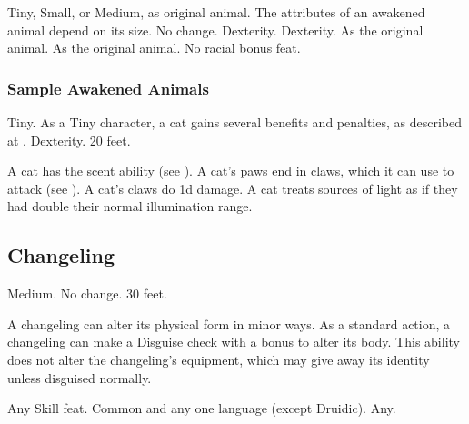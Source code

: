          Tiny, Small, or Medium, as original animal.
         The attributes of an awakened animal depend on its size.
         No change.
          Dexterity.
          Dexterity.
         As the original animal.
         As the original animal.
         No racial bonus feat.

        \subsubsection{Sample Awakened Animals}


             Tiny. As a Tiny character, a cat gains several benefits and penalties, as described at .
              Dexterity.
             20 feet.
            \begin{itemize}
                 A cat has the scent ability (see ).
                 A cat's paws end in claws, which it can use to attack (see ). A cat's claws do \minus1d damage.
                 A cat treats sources of light as if they had double their normal illumination range.
            \end{itemize}

        \subsection{Changeling}

             Medium.
             No change.
             30 feet.
            \begin{itemize}
                 A changeling can alter its physical form in minor ways. As a standard action, a changeling can make a Disguise check with a  bonus to alter its body. This ability does not alter the changeling's equipment, which may give away its identity unless disguised normally.
            \end{itemize}
             Any Skill feat.
             Common and any one language (except Druidic).
             Any.

